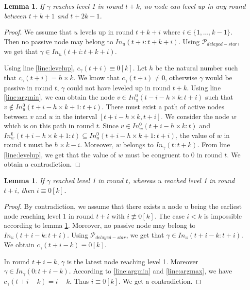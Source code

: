\documentclass[11pt,letterpaper]{article}
\newtheorem{lem}[thm]{Lemma}
\newcommand{\cent}{\gamma}
\begin{document}
\begin{lem} \label{lem:no-close-levelup}
	If $\cent$ reaches level 1 in round $t+k$, no node can level up in any round between $t+k+1$ and $t+2k-1$.
\end{lem}
\begin{proof}
	We assume that $u$ levels up in round $t+k+i$ where $i \in \{1, \dots, k-1\}$.
	Then no passive node may belong to $In_u(t+i:t+k+i)$.
	Using $\mathcal{P}_{delayed-star}$, we get that $\cent \in In_u(t+i:t+k+i)$.

	Using line \ref{line:levelup}, $c_\cent(t+i) \equiv 0 [k]$. Let $h$ be the natural number such that $c_\cent(t+i) = h \times k$.
	We know that $c_\cent(t+i) \neq 0$, otherwise $\cent$ would be passive in round $t$, $\cent$ could not have leveled up in round $t+k$.
	Using line \ref{line:argmin}, we can obtain the node $v \in In_u^0(t-i-h\times k:t+i)$ such that $v \notin In_u^0(t+i-h\times k+1:t+i)$.
	There must exist a path of active nodes between $v$ and $u$ in the interval $[t+i-h\times k, t+i]$.
	We consider the node $w$ which is on this path in round $t$.
	Since $v \in In_w^0(t+i-h\times k:t)$ and $In_w^0(t+i-h\times k+1:t) \subseteq In_u^0(t+i-h\times k+1:t+i)$,
	the value of $w$ in round $t$ must be $h\times k - i$.
	Moreover, $w$ belongs to $In_\cent(t:t+k)$. From line \ref{line:levelup}, we get that the value of $w$ must be congruent to 0 in round $t$.
	We obtain a contradiction.
\end{proof}

\begin{lem} \label{lem:later-level}
	If $\cent$ reached level 1 in round $t$, whereas $u$ reached level 1 in round $t+i$, then $i \equiv 0 [k]$. 
\end{lem}
\begin{proof}
	By contradiction, we assume that there exists a node $u$ being the earliest node reaching level 1 in round $t+i$ with $i \not\equiv 0 [k]$.
	The case $i < k$ is impossible according to lemma \ref{lem:no-close-levelup}.
	Moreover, no passive node may belong to $In_u(t+i-k:t+i)$.
	Using $\mathcal{P}_{delayed-star}$, we get that $\cent \in In_u(t+i-k:t+i)$.
	We obtain $c_\cent(t+i-k) \equiv 0 [k]$.

	In round $t+i-k$, $\cent$ is the latest node reaching level 1. Moreover $\cent \in In_\cent(0:t+i-k)$.
	According to \ref{line:argmin} and \ref{line:argmax}, we have $c_\cent(t+i-k) = i-k$.
	Thus $i \equiv 0 [k]$. We get a contradiction.
\end{proof}
\end{document}
